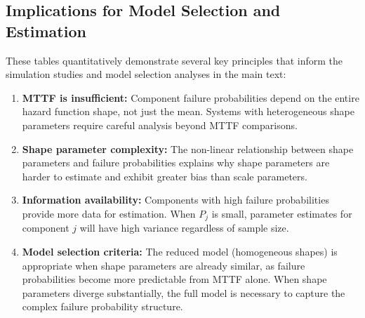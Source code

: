 \documentclass[11pt]{article}
\begin{document}
\subsection{Implications for Model Selection and Estimation}

These tables quantitatively demonstrate several key principles that inform the simulation studies and model selection analyses in the main text:

\begin{enumerate}
\item \textbf{MTTF is insufficient:} Component failure probabilities depend on the entire hazard function shape, not just the mean. Systems with heterogeneous shape parameters require careful analysis beyond MTTF comparisons.

\item \textbf{Shape parameter complexity:} The non-linear relationship between shape parameters and failure probabilities explains why shape parameters are harder to estimate and exhibit greater bias than scale parameters.

\item \textbf{Information availability:} Components with high failure probabilities provide more data for estimation. When $P_j$ is small, parameter estimates for component $j$ will have high variance regardless of sample size.

\item \textbf{Model selection criteria:} The reduced model (homogeneous shapes) is appropriate when shape parameters are already similar, as failure probabilities become more predictable from MTTF alone. When shape parameters diverge substantially, the full model is necessary to capture the complex failure probability structure.
\end{enumerate}



\end{document}
